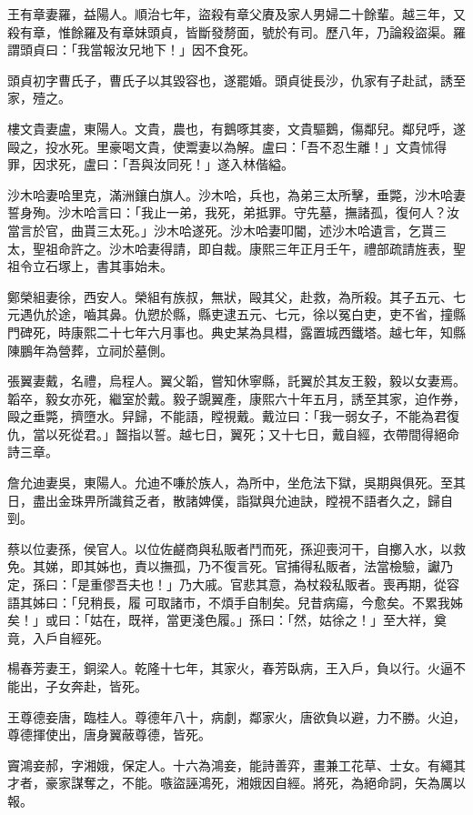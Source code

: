 \begin{pinyinscope}
王有章妻羅，益陽人。順治七年，盜殺有章父賡及家人男婦二十餘輩。越三年，又殺有章，惟餘羅及有章妹頭貞，皆斷發剺面，號於有司。歷八年，乃論殺盜渠。羅謂頭貞曰：「我當報汝兄地下！」因不食死。

頭貞初字曹氏子，曹氏子以其毀容也，遂罷婚。頭貞徙長沙，仇家有子赴試，誘至家，殪之。

樓文貴妻盧，東陽人。文貴，農也，有鵝啄其麥，文貴驅鵝，傷鄰兒。鄰兒呼，遂毆之，投水死。里豪喝文貴，使鬻妻以為解。盧曰：「吾不忍生離！」文貴怵得罪，因求死，盧曰：「吾與汝同死！」遂入林偕縊。

沙木哈妻哈里克，滿洲鑲白旗人。沙木哈，兵也，為弟三太所擊，垂斃，沙木哈妻誓身殉。沙木哈言曰：「我止一弟，我死，弟抵罪。守先墓，撫諸孤，復何人？汝當言於官，曲貰三太死。」沙木哈遂死。沙木哈妻叩閽，述沙木哈遺言，乞貰三太，聖祖命許之。沙木哈妻得請，即自裁。康熙三年正月壬午，禮部疏請旌表，聖祖令立石塚上，書其事始未。

鄭榮組妻徐，西安人。榮組有族叔，無狀，毆其父，赴救，為所殺。其子五元、七元遇仇於途，嚙其鼻。仇愬於縣，縣吏逮五元、七元，徐以冤白吏，吏不省，撞縣門碑死，時康熙二十七年六月事也。典史某為具槥，露置城西鐵塔。越七年，知縣陳鵬年為營葬，立祠於墓側。

張翼妻戴，名禮，烏程人。翼父韜，嘗知休寧縣，託翼於其友王毅，毅以女妻焉。韜卒，毅女亦死，繼室於戴。毅子覬翼產，康熙六十年五月，誘至其家，迫作券，毆之垂斃，擠墮水。舁歸，不能語，瞠視戴。戴泣曰：「我一弱女子，不能為君復仇，當以死從君。」齧指以誓。越七日，翼死；又十七日，戴自經，衣帶間得絕命詩三章。

詹允迪妻吳，東陽人。允迪不嗛於族人，為所中，坐危法下獄，吳期與俱死。至其日，盡出金珠畀所識貧乏者，散諸婢僕，詣獄與允迪訣，瞠視不語者久之，歸自剄。

蔡以位妻孫，侯官人。以位佐鹺商與私販者鬥而死，孫迎喪河干，自擲入水，以救免。其娣，即其姊也，責以撫孤，乃不復言死。官捕得私販者，法當檢驗，讞乃定，孫曰：「是重僇吾夫也！」乃大戚。官悲其意，為杖殺私販者。喪再期，從容語其姊曰：「兒稍長，履可取諸市，不煩手自制矣。兒昔病瘍，今愈矣。不累我姊矣！」或曰：「姑在，既祥，當更淺色履。」孫曰：「然，姑徐之！」至大祥，奠竟，入戶自經死。

楊春芳妻王，銅梁人。乾隆十七年，其家火，春芳臥病，王入戶，負以行。火逼不能出，子女奔赴，皆死。

王尊德妾唐，臨桂人。尊德年八十，病劇，鄰家火，唐欲負以避，力不勝。火迫，尊德揮使出，唐身翼蔽尊德，皆死。

竇鴻妾郝，字湘娥，保定人。十六為鴻妾，能詩善弈，畫兼工花草、士女。有繩其才者，豪家謀奪之，不能。嗾盜誣鴻死，湘娥因自經。將死，為絕命詞，矢為厲以報。


\end{pinyinscope}
